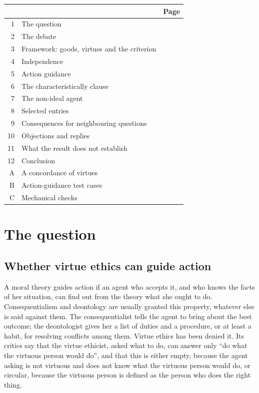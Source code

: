 \documentclass{situationist-preprint}
\begin{document}
\begin{center}\small
\begin{tabular}{@{}rlr@{}}
\toprule
& & Page \\
\midrule
1 & The question & \pageref{s:intro} \\
2 & The debate & \pageref{s:history} \\
3 & Framework: goods, virtues and the criterion & \pageref{s:framework} \\
4 & Independence & \pageref{s:independence} \\
5 & Action guidance & \pageref{s:guidance} \\
6 & The characteristically clause & \pageref{s:characteristically} \\
7 & The non-ideal agent & \pageref{s:nonideal} \\
8 & Selected entries & \pageref{s:entries} \\
9 & Consequences for neighbouring questions & \pageref{s:consequences} \\
10 & Objections and replies & \pageref{s:objections} \\
11 & What the result does not establish & \pageref{s:limits} \\
12 & Conclusion & \pageref{s:conclusion} \\
A & A concordance of virtues & \pageref{s:appA} \\
B & Action-guidance test cases & \pageref{s:appB} \\
C & Mechanical checks & \pageref{s:appC} \\
\bottomrule
\end{tabular}
\end{center}

\section{The question}\label{s:intro}

\subsection{Whether virtue ethics can guide action}

A moral theory guides action if an agent who accepts it, and who knows the facts of her situation, can find out from the theory what she ought to do. Consequentialism and deontology are usually granted this property, whatever else is said against them. The consequentialist tells the agent to bring about the best outcome; the deontologist gives her a list of duties and a procedure, or at least a habit, for resolving conflicts among them. Virtue ethics has been denied it. Its critics say that the virtue ethicist, asked what to do, can answer only \enquote{do what the virtuous person would do}, and that this is either empty, because the agent asking is not virtuous and does not know what the virtuous person would do, or circular, because the virtuous person is defined as the person who does the right thing.
\end{document}
